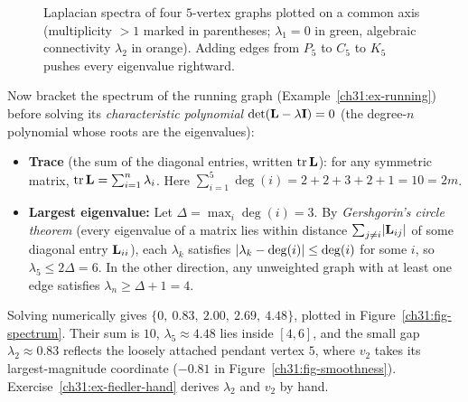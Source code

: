 \begin{figure}[htbp]
\caption{Laplacian spectra of four $5$-vertex graphs plotted on a common axis (multiplicity $>1$ marked in parentheses; $\lambda_1=0$ in green, algebraic connectivity $\lambda_2$ in orange). Adding edges from $P_5$ to $C_5$ to $K_5$ pushes every eigenvalue rightward.}
\label{ch31:fig-small-spectra}
\end{figure}

\begin{labbox}
Now bracket the spectrum of the running graph (Example~\ref{ch31:ex-running}) before solving its \emph{characteristic polynomial} $\det(\mathbf{L} - \lambda\mathbf{I}) = 0$ (the degree-$n$ polynomial whose roots are the eigenvalues):
\begin{itemize}
  \item \textbf{Trace} (the sum of the diagonal entries, written $\operatorname{tr}\mathbf{L}$): for any symmetric matrix, $\operatorname{tr}\mathbf{L} = \sum_{i=1}^n \lambda_i$. Here $\sum_{i=1}^5 \deg(i) = 2+2+3+2+1 = 10 = 2m$.
  \item \textbf{Largest eigenvalue:} Let $\Delta = \max_i \deg(i) = 3$. By \emph{Gershgorin's circle theorem} (every eigenvalue of a matrix lies within distance $\sum_{j\neq i}\lvert\mathbf{L}_{ij}\rvert$ of some diagonal entry $\mathbf{L}_{ii}$), each $\lambda_k$ satisfies $\lvert\lambda_k - \deg(i)\rvert \le \deg(i)$ for some $i$, so $\lambda_5 \le 2\Delta = 6$. In the other direction, any unweighted graph with at least one edge satisfies $\lambda_n \ge \Delta + 1 = 4$.
\end{itemize}
Solving numerically gives $\{0,\ 0.83,\ 2.00,\ 2.69,\ 4.48\}$, plotted in Figure~\ref{ch31:fig-spectrum}. Their sum is $10$, $\lambda_5 \approx 4.48$ lies inside $[4,6]$, and the small gap $\lambda_2 \approx 0.83$ reflects the loosely attached pendant vertex $5$, where $v_2$ takes its largest-magnitude coordinate ($-0.81$ in Figure~\ref{ch31:fig-smoothness}). Exercise~\ref{ch31:ex-fiedler-hand} derives $\lambda_2$ and $v_2$ by hand.
\end{labbox}

